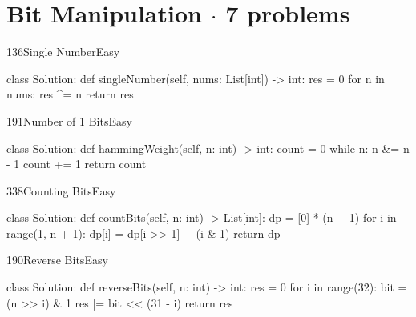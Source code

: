\section{Bit Manipulation {\normalsize\color{muted}$\cdot$ 7 problems}}

\begin{problem}{136}{Single Number}{Easy}
\begin{code}
class Solution:
    def singleNumber(self, nums: List[int]) -> int:
        res = 0
        for n in nums:
            res ^= n
        return res
\end{code}
\end{problem}

\begin{problem}{191}{Number of 1 Bits}{Easy}
\begin{code}
class Solution:
    def hammingWeight(self, n: int) -> int:
        count = 0
        while n:
            n &= n - 1
            count += 1
        return count
\end{code}
\end{problem}

\begin{problem}{338}{Counting Bits}{Easy}
\begin{code}
class Solution:
    def countBits(self, n: int) -> List[int]:
        dp = [0] * (n + 1)
        for i in range(1, n + 1):
            dp[i] = dp[i >> 1] + (i & 1)
        return dp
\end{code}
\end{problem}

\begin{problem}{190}{Reverse Bits}{Easy}
\begin{code}
class Solution:
    def reverseBits(self, n: int) -> int:
        res = 0
        for i in range(32):
            bit = (n >> i) & 1
            res |= bit << (31 - i)
        return res
\end{code}
\end{problem}

